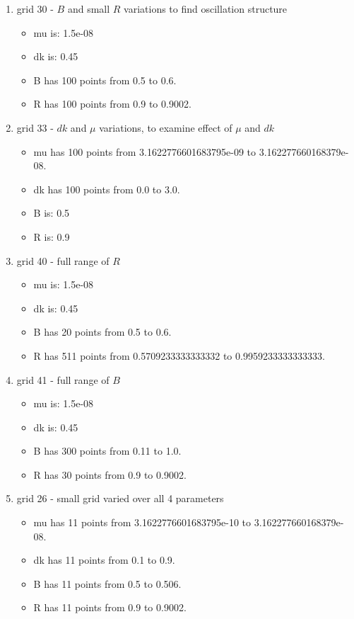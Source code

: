 \documentclass[11pt]{article}
\providecommand{\tightlist}{%
      \setlength{\itemsep}{0pt}\setlength{\parskip}{0pt}}
\begin{document}
\begin{enumerate}
\def\labelenumi{\arabic{enumi})}
\setcounter{enumi}{-1}
\tightlist
\item
  grid 30 - \(B\) and small \(R\) variations to find oscillation
  structure

  \begin{itemize}
  \tightlist
  \item
    mu is: 1.5e-08
  \item
    dk is: 0.45
  \item
    B has 100 points from 0.5 to 0.6.
  \item
    R has 100 points from 0.9 to 0.9002.
  \end{itemize}
\item
  grid 33 - \(dk\) and \(\mu\) variations, to examine effect of \(\mu\)
  and \(dk\)

  \begin{itemize}
  \tightlist
  \item
    mu has 100 points from 3.1622776601683795e-09 to
    3.162277660168379e-08.
  \item
    dk has 100 points from 0.0 to 3.0.
  \item
    B is: 0.5
  \item
    R is: 0.9
  \end{itemize}
\item
  grid 40 - full range of \(R\)

  \begin{itemize}
  \tightlist
  \item
    mu is: 1.5e-08
  \item
    dk is: 0.45
  \item
    B has 20 points from 0.5 to 0.6.
  \item
    R has 511 points from 0.5709233333333332 to 0.9959233333333333.
  \end{itemize}
\item
  grid 41 - full range of \(B\)

  \begin{itemize}
  \tightlist
  \item
    mu is: 1.5e-08
  \item
    dk is: 0.45
  \item
    B has 300 points from 0.11 to 1.0.
  \item
    R has 30 points from 0.9 to 0.9002.
  \end{itemize}
\item
  grid 26 - small grid varied over all 4 parameters

  \begin{itemize}
  \tightlist
  \item
    mu has 11 points from 3.1622776601683795e-10 to
    3.162277660168379e-08.
  \item
    dk has 11 points from 0.1 to 0.9.
  \item
    B has 11 points from 0.5 to 0.506.
  \item
    R has 11 points from 0.9 to 0.9002.
  \end{itemize}
\end{enumerate}
\end{document}
